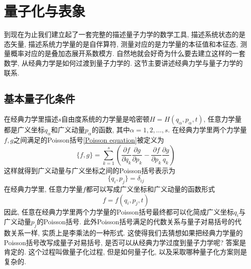 \documentclass[a4paper,11pt]{book}
\begin{document}
\chapter{量子化与表象}
到现在为止我们建立起了一套完整的描述量子力学的数学工具, 描述系统状态的是态矢量, 描述系统力学量的是自伴算符, 测量对应的是力学量的本征值和本征态, 测量概率对应的是叠加态展开系数模方. 自然地就会好奇为什么要去建立这样的一套数学, 从经典力学是如何过渡到量子力学的. 这节主要讲述经典力学与量子力学的联系.
\section{基本量子化条件}
在经典力学里描述$s$自由度系统的力学量是哈密顿$H=H(q_\alpha,p_\alpha,t)$, 任意力学量都是广义坐标$q_\alpha$和广义动量$p_\alpha$的函数, 其中$\alpha=1,2,\dots,s$. 在经典力学里两个力学量$f,g$之间满足的Poisson括号\ref{Poisson equation}被定义为
\begin{equation*}
  \{f,g\}=\sum_{k=1}^{s}\left(\frac{\partial f}{\partial q_k}\frac{\partial g}{\partial p_k}-\frac{\partial f}{\partial p_k}\frac{\partial g}{q_k}\right)
\end{equation*}
这样就得到广义动量与广义坐标之间的Poisson括号表示为
\begin{equation*}
  \{q_i,p_j\}=\delta_{ij}
\end{equation*}
在经典力学里, 任意力学量$f$都可以写成广义坐标和广义动量的函数形式
\begin{equation*}
  f=f(q_i,p_j,t)
\end{equation*}
因此, 任意在经典力学里两个力学量的Poisson括号最终都可以化简成广义坐标$q_i$与广义动量$p_j$的Poisson括号. 此外Poisson括号满足的代数关系与量子对易括号的代数关系一样, 实质上是李乘法的一种形式. 这使得我们去猜想如果把经典力学量的Poisson括号改写成量子对易括号, 是否可以从经典力学过度到量子力学呢? 答案是肯定的. 这个过程叫做量子化过程, 但是如何量子化, 以及采取哪种量子化方案则是复杂的.
\end{document}
